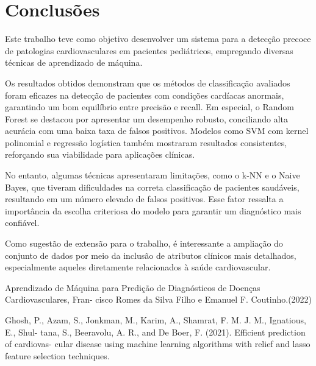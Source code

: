 \documentclass[10pt, conference, compsocconf]{IEEEtran}
\begin{document}
\section{Conclusões}

Este trabalho teve como objetivo desenvolver um sistema para a detecção precoce de patologias cardiovasculares em pacientes pediátricos, empregando diversas técnicas de aprendizado de máquina. 

Os resultados obtidos demonstram que os métodos de classificação avaliados foram eficazes na detecção de pacientes com condições cardíacas anormais, garantindo um bom equilíbrio entre precisão e recall. Em especial, o Random Forest se destacou por apresentar um desempenho robusto, conciliando alta acurácia com uma baixa taxa de falsos positivos. Modelos como SVM com kernel polinomial e regressão logística também mostraram resultados consistentes, reforçando sua viabilidade para aplicações clínicas.

No entanto, algumas técnicas apresentaram limitações, como o k-NN e o Naive Bayes, que tiveram dificuldades na correta classificação de pacientes saudáveis, resultando em um número elevado de falsos positivos. Esse fator ressalta a importância da escolha criteriosa do modelo para garantir um diagnóstico mais confiável.

Como sugestão de extensão para o trabalho, é interessante a ampliação do conjunto de dados por meio da inclusão de atributos clínicos mais detalhados, especialmente aqueles diretamente relacionados à saúde cardiovascular.
\begin{thebibliography}{1}

  Aprendizado de Máquina para
Predição de Diagnósticos de Doenças Cardiovasculares, Fran-
cisco Romes da Silva Filho e Emanuel F. Coutinho.(2022)

Ghosh, P., Azam, S., Jonkman, M., Karim, A., Shamrat, F. M. J. M., Ignatious, E., Shul-
tana, S., Beeravolu, A. R., and De Boer, F. (2021). Efficient prediction of cardiovas-
cular disease using machine learning algorithms with relief and lasso feature selection
techniques. 

    
  
  \end{thebibliography}
\end{document}
